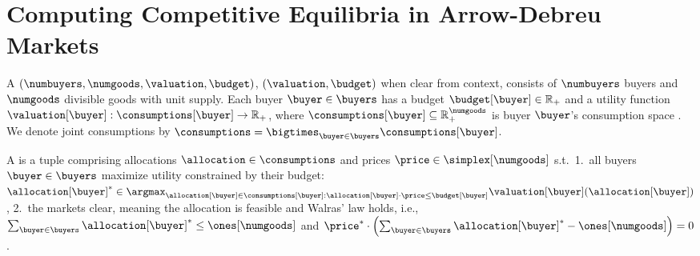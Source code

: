 \section{Computing Competitive Equilibria in Arrow-Debreu Markets}
\label{sec:arrow_debreu}


A  $(\numbuyers, \numgoods, \valuation, \budget)$, $(\valuation, \budget)$ when clear from context, consists of $\numbuyers$ buyers and $\numgoods$ divisible goods with unit supply.
Each buyer $\buyer \in \buyers$ has a budget $\budget[\buyer] \in \mathbb{R}_{+}$ and a utility function $\valuation[\buyer]: \consumptions[\buyer] \to \mathbb{R}_+$, where $\consumptions[\buyer] \subseteq \mathbb{R}^{\numgoods}_+$ is buyer $\buyer$'s consumption space \cite{brainard2000compute}.
We denote
joint consumptions by $\consumptions = \bigtimes_{\buyer \in \buyers} \consumptions[\buyer]$.

A  is a tuple comprising allocations $\allocation \in \consumptions$ and prices $\price \in \simplex[\numgoods]$ s.t.\ 1.~all buyers $\buyer \in \buyers$ maximize utility constrained by their budget: $\allocation[\buyer]^* \in \argmax_{\allocation[\buyer] \in \consumptions[\buyer]: \allocation[\buyer] \cdot \price \leq \budget[\buyer]} \valuation[\buyer](\allocation[\buyer])$, 2.~the markets clear, meaning the allocation is feasible and Walras' law holds, i.e., $ \sum_{\buyer \in \buyers} \allocation[\buyer]^*  \leq \ones[\numgoods]$ and $\price^* \cdot \left( \sum_{\buyer \in \buyers} \allocation[\buyer]^*  - \ones[\numgoods] \right) = 0$. 




